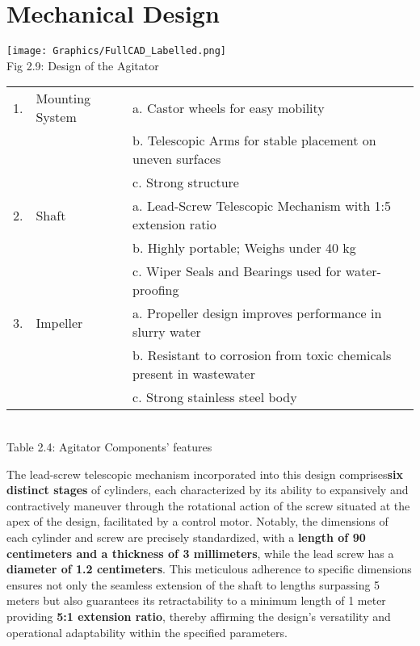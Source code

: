 \documentclass[a4,10pt]{report}
\begin{document}
\section{Mechanical Design}
\begin{center}
    \texttt{[image: Graphics/FullCAD\_Labelled.png]} \\
    Fig 2.9: Design of the Agitator \\
    \begin{tabular}{|r|l|l|}
        \hline 
        1. & Mounting System & a. Castor wheels for easy mobility \\
        & & b. Telescopic Arms for stable placement on uneven surfaces \\
        & & c. Strong structure \\
        \hline
        2. & Shaft & a. Lead-Screw Telescopic Mechanism with 1:5 extension ratio \\
        & & b. Highly portable; Weighs under 40 kg \\
        & & c. Wiper Seals and Bearings used for water-proofing \\
        \hline
        3. & Impeller & a. Propeller design improves performance in slurry water \\
        & & b. Resistant to corrosion from toxic chemicals present in wastewater \\
        & & c. Strong stainless steel body \\
        \hline
    \end{tabular} \\
    \normalsize{Table 2.4: Agitator Components' features} \\
\end{center}
The lead-screw telescopic mechanism incorporated into this design comprises\textbf{six distinct stages} of cylinders, each characterized by its ability to expansively and contractively maneuver through the rotational action of the screw situated at the apex of the design, facilitated by a control motor. Notably, the dimensions of each cylinder and screw are precisely standardized, with a \textbf{length of 90 centimeters and a thickness of 3 millimeters}, while the lead screw has a \textbf{diameter of 1.2 centimeters}. This meticulous adherence to specific dimensions ensures not only the seamless extension of the shaft to lengths surpassing 5 meters but also guarantees its retractability to a minimum length of 1 meter providing \textbf{5:1 extension ratio}, thereby affirming the design's versatility and operational adaptability within the specified parameters.
\end{document}
